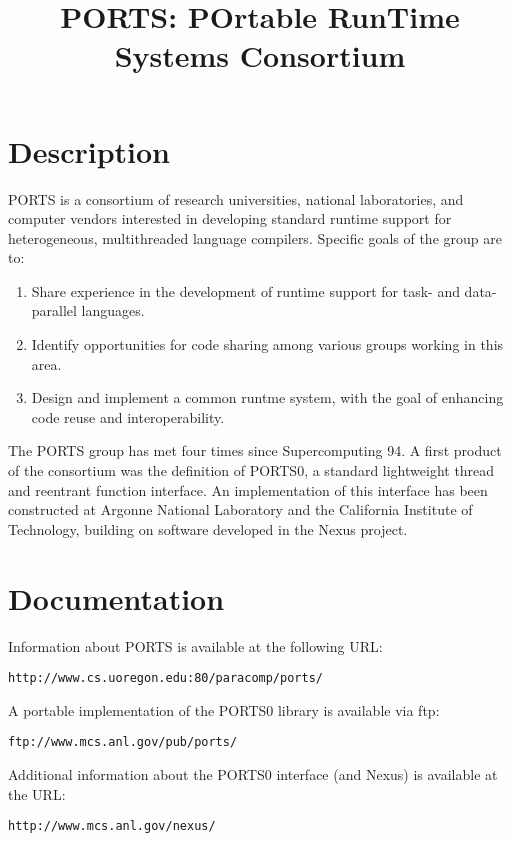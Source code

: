 \pagestyle{empty}

\pagestyle{empty}
\title{PORTS: POrtable RunTime Systems Consortium}

\date{}
\maketitle

\section*{Description}

PORTS is a consortium of research universities, national laboratories,
and computer vendors interested in developing standard runtime support
for heterogeneous, multithreaded language compilers.  Specific goals
of the group are to:

\begin{enumerate}
\item
Share experience in the development of runtime support for task-
and data-parallel languages.
\item
Identify opportunities for code sharing among various groups
working in this area.
\item
Design and implement a common runtme system, with the goal of
enhancing code reuse and interoperability. 
\end{enumerate}

The PORTS group has met four times since Supercomputing 94.  A first
product of the consortium was the definition of PORTS0, a standard
lightweight thread and reentrant function interface.  An
implementation of this interface has been constructed at Argonne
National Laboratory and the California Institute of Technology,
building on software developed in the Nexus project.


\section*{Documentation}

Information about PORTS is available at the following URL:
\begin{center}
{\tt http://www.cs.uoregon.edu:80/paracomp/ports/}
\end{center}
A portable implementation of the PORTS0 library is available via
ftp:
\begin{center}
{\tt ftp://www.mcs.anl.gov/pub/ports/}
\end{center}
Additional information about the PORTS0 interface (and Nexus) is available
at the URL:
\begin{center}
{\tt http://www.mcs.anl.gov/nexus/}
\end{center}

